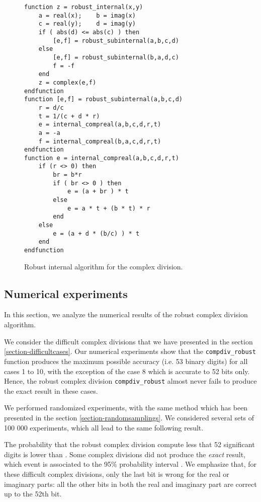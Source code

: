 \documentclass{paper}
\newcommand{\scivar}[1]{\texttt{#1}}
\begin{document}
\begin{figure}
\caption{Robust internal algorithm for the complex division.}
\label{fig-compdiv-algointernal}
\lstset{language=scilabscript}
\begin{lstlisting}
function z = robust_internal(x,y)
    a = real(x);    b = imag(x)
    c = real(y);    d = imag(y)
    if ( abs(d) <= abs(c) ) then
        [e,f] = robust_subinternal(a,b,c,d)
    else
        [e,f] = robust_subinternal(b,a,d,c)
        f = -f
    end
    z = complex(e,f)
endfunction
function [e,f] = robust_subinternal(a,b,c,d)
    r = d/c
    t = 1/(c + d * r)
    e = internal_compreal(a,b,c,d,r,t)
    a = -a
    f = internal_compreal(b,a,c,d,r,t)
endfunction
function e = internal_compreal(a,b,c,d,r,t)
    if (r <> 0) then
        br = b*r
        if ( br <> 0 ) then
            e = (a + br ) * t
        else
            e = a * t + (b * t) * r
        end
    else
        e = (a + d * (b/c) ) * t
    end
endfunction
\end{lstlisting}
\end{figure}




\subsection{Numerical experiments}

In this section, we analyze the numerical results 
of the robust complex division algorithm. 

We consider the difficult complex divisions that we have presented 
in the section \ref{section-difficultcases}. 
Our numerical experiments show that the \scivar{compdiv\_robust} 
function produces the maximum possible accuracy (i.e. 53 binary digits) 
for all cases 1 to 10, with the exception of the case 8 which is accurate 
to 52 bits only.
Hence, the robust complex division \scivar{compdiv\_robust} 
almost never fails to produce the exact result in these cases. 

We performed randomized experiments, with the same 
method which has been presented in the section \ref{section-randomsamplings}. 
We considered several sets of 100 000 experiments, which all lead to the 
same following result. 

The probability that the robust complex division compute less that 52 
significant digits is lower than . 
Some complex divisions did not produce the \emph{exact} result, 
which event is associated to the 95\% probability 
interval .
We emphasize that, for these difficult complex divisions,
only the last bit is wrong for the real or imaginary 
parts: all the other bits in both the real and imaginary part 
are correct up to the 52th bit.
\end{document}

